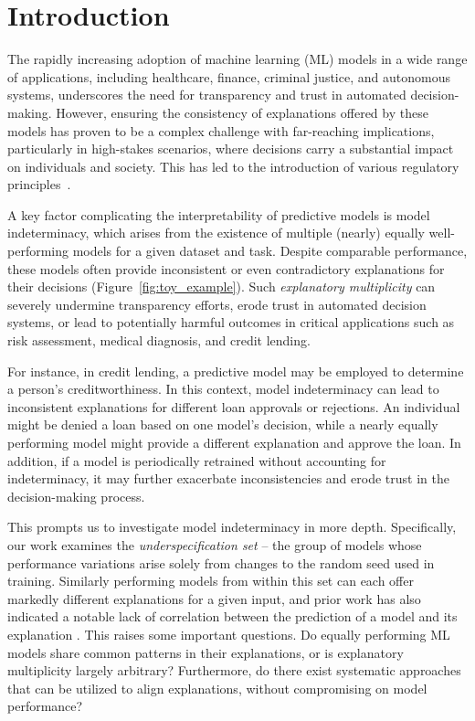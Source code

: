 \section{Introduction}
\label{sec:introduction}

The rapidly increasing adoption of machine learning (ML) models in a wide range of applications, including healthcare, finance, criminal justice, and autonomous systems, underscores the need for transparency and trust in automated decision-making. However, ensuring the consistency of explanations offered by these models has proven to be a complex challenge with far-reaching implications, particularly in high-stakes scenarios, where decisions carry a substantial impact on individuals and society. This has led to the introduction of various regulatory principles~\citep{aibillofrights, gdpr}.

A key factor complicating the interpretability of predictive models is model indeterminacy, which arises from the existence of multiple (nearly) equally well-performing models for a given dataset and task. Despite comparable performance, these models often provide inconsistent or even contradictory explanations for their decisions (Figure~\ref{fig:toy_example}). Such \textit{explanatory multiplicity} can severely undermine transparency efforts, erode trust in automated decision systems, or lead to potentially harmful outcomes in critical applications such as risk assessment, medical diagnosis, and credit lending.

For instance, in credit lending, a predictive model may be employed to determine a person's creditworthiness. In this context, model indeterminacy can lead to inconsistent explanations for different loan approvals or rejections. An individual might be denied a loan based on one model's decision, while a nearly equally performing model might provide a different explanation and approve the loan. In addition, if a model is periodically retrained without accounting for indeterminacy, it may further exacerbate inconsistencies and erode trust in the decision-making process.\vspace{-1pt}

This prompts us to investigate model indeterminacy in more depth. Specifically, our work examines the \textit{underspecification set} \citep{brunet2022, damour2022} -- the group of models whose performance variations arise solely from changes to the random seed used in training. Similarly performing models from within this set can each offer markedly different explanations for a given input, and prior work has also indicated a notable lack of correlation between the prediction of a model and its explanation \citep{black2021selective, brunet2022}. This raises some important questions. Do equally performing ML models share common patterns in their explanations, or is explanatory multiplicity largely arbitrary? Furthermore, do there exist systematic approaches that can be utilized to align explanations, without compromising on model performance?\vspace{-1pt}

